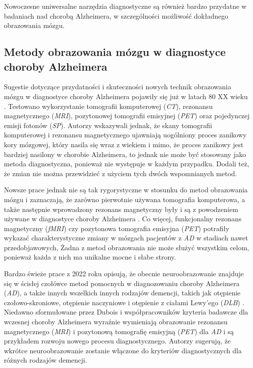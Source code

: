 Nowoczesne uniwersalne narzędzia diagnostyczne są również bardzo przydatne w badaniach nad chorobą Alzheimera, w szczególności możliwość dokładnego obrazowania mózgu.

\subsection{Metody obrazowania mózgu w diagnostyce choroby Alzheimera}

Sugestie dotyczące przydatności i skuteczności nowych technik obrazowania mózgu w diagnostyce choroby Alzheimera pojawiły się już w latach 80 XX wieku \cite{mcgeer1986brain}.
Testowano wykorzystanie tomografii komputerowej (\emph{CT}), rezonansu magnetycznego (\emph{MRI}), pozytonowej tomografii emisyjnej (\emph{PET}) oraz pojedynczej emisji fotonów (\emph{SP}).
Autorzy wskazywali jednak, że skany tomografii komputerowej i rezonansu magnetycznego ujawniają uogólniony proces zanikowy kory mózgowej, który nasila się wraz z wiekiem i mimo, że proces zanikowy jest bardziej nasilony w chorobie Alzheimera, to jednak nie może być stosowany jako metoda diagnostyczna, ponieważ nie występuje w każdym przypadku.
Dodali też, że zmian nie można przewidzieć z użyciem tych dwóch wspomnianych metod.

Nowsze prace jednak nie są tak rygorystyczne w stosunku do metod obrazowania mózgu i zaznaczają, że zarówno pierwotnie używana tomografia komputerowa, a także następnie wprowadzony rezonans magnetyczny były i są z powodzeniem używane w diagnostyce choroby Alzheimera \cite{johnson2012brain}.
Co więcej, funkcjonalny rezonans magnetyczny (\emph{fMRI}) czy pozytonowa tomografia emisyjna (\emph{PET}) potrafiły wykazać charakterystyczne zmiany w mózgach pacjentów z \emph{AD} w stadiach nawet przedobjawowych,
Żadna z metod obrazowania nie może służyć wszystkim celom, ponieważ każda z nich ma unikalne mocne i słabe strony.

Bardzo świeże prace z 2022 roku opisują, że obecnie neuroobrazowanie znajduje się w ścisłej czołówce metod pomocnych w diagnozowaniu choroby Alzheimera (\emph{AD}), a także innych wszelkich innych rodzajów demencji, takich jak otępienie czołowo-skroniowe, otępienie naczyniowe i otępienie z ciałami Lewy'ego (\emph{DLB}) \cite{scheltens2022imaging}.
Niedawno sformułowane przez Dubois i współpracowników kryteria badawcze dla wczesnej choroby Alzheimera wyraźnie wymieniają obrazowanie rezonansu magnetycznego (\emph{MRI}) i pozytonową tomografię emisyjną (\emph{PET}) dla \emph{AD} i są przykładem rozwoju nowego procesu diagnostycznego.
Autorzy sugerują, że wkrótce neuroobrazowanie zostanie włączone do kryteriów diagnostycznych dla różnych rodzajów demencji.

